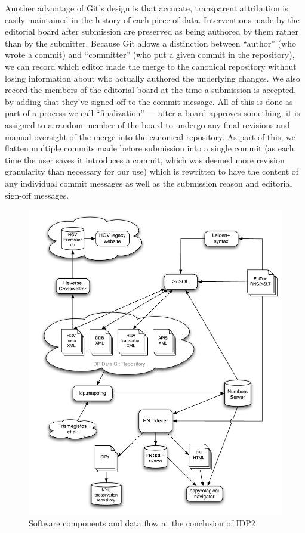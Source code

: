 \documentclass[]{article}
\begin{document}
Another advantage of Git's design is that accurate, transparent attribution is easily maintained in the history of each piece of data. Interventions made by the editorial board after submission are preserved as being authored by them rather than by the submitter. Because Git allows a distinction between “author” (who wrote a commit) and “committer” (who put a given commit in the repository), we can record which editor made the merge to the canonical repository without losing information about who actually  authored the underlying changes. We also record the members of the editorial board at the time a submission is accepted, by adding that they've signed off to the commit message. All of this is done as part of a process we call “finalization” — after a board approves something, it is assigned to a random member of the board to undergo any final revisions and manual oversight of the merge into the canonical repository. As part of this, we flatten multiple commits made before submission into a single commit (as each time the user saves it introduces a commit, which was deemed more revision granularity than necessary for our use) which is rewritten to have the content of any individual commit messages as well as the submission reason and editorial sign-off messages.
\begin{figure}[!h]
  \centering
  \includegraphics[width=\textwidth]{images/TopLevelDataFlow4Proposal-HAC.pdf}
  \caption{Software components and data flow at the conclusion of IDP2\label{dataflow}}
\end{figure}
\end{document}
